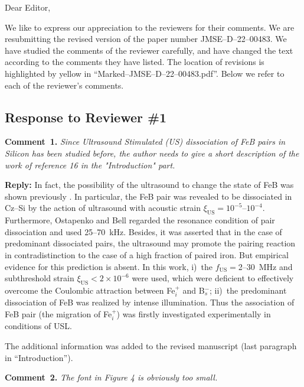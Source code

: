 \documentclass[sn-mathphys]{sn-jnl}
\begin{document}
Dear Editor,

We like to express our appreciation to the reviewers for their comments.
We are resubmitting the revised version of the paper number JMSE--D--22--00483.
We have studied the comments of the reviewer carefully, and have changed the text according to the comments they
have listed.
The location of revisions is  highlighted by yellow in ``Marked--JMSE--D--22--00483.pdf''.
Below we refer to each of the reviewer’s comments.



\subsection*{Response to Reviewer \#1 }

\noindent
\textcolor[rgb]{0.00,0.50,1.00}{\textbf{Comment~1.}}
\emph{Since Ultrasound Stimulated (US) dissociation of FeB pairs in Silicon has been studied before, the author needs to give a short description of the work of reference 16 in the "Introduction" part.}

\noindent
\textcolor[rgb]{0.51,0.00,0.00}{\textbf{Reply:}}
In fact, the possibility of the ultrasound to  change the state of FeB was shown previously  \cite{Ostapenko1994APL,Ostapenko1995}.
In particular, the
FeB pair was revealed \cite{Ostapenko1995} to be dissociated in Cz–Si by the action of ultrasound with acoustic strain $\xi_\mathrm{US}=10^{-5}$--$10^{-4}$.
Furthermore, Ostapenko and Bell \cite{Ostapenko1995} regarded the resonance condition of pair dissociation and used 25--70~kHz.
Besides, it was asserted \cite{Ostapenko1994APL} that in the case of
predominant dissociated pairs, the ultrasound may promote the pairing reaction in contradistinction to the case of a
high fraction of paired iron.
But  empirical evidence  for this prediction  is absent.
In this work,
i)~the $f_\mathrm{US}=$2--30~MHz and subthreshold strain $\xi_\mathrm{US}<2\times10^{-6}$ were used, which were deficient to effectively overcome the Coulombic attraction between Fe$_i^+$ and B$_s^-$;
ii)~the predominant  dissociation of FeB was realized by intense illumination.
Thus the association of FeB pair (the migration  of Fe$_i^+$) was firstly investigated experimentally in conditions of USL.


The additional information was added to the revised manuscript
(last paragraph in ``Introduction'').



\vspace{1cm}
\noindent
\textcolor[rgb]{0.00,0.50,1.00}{\textbf{Comment~2.}}
\emph{The font in Figure 4 is obviously too small.}
\end{document}
